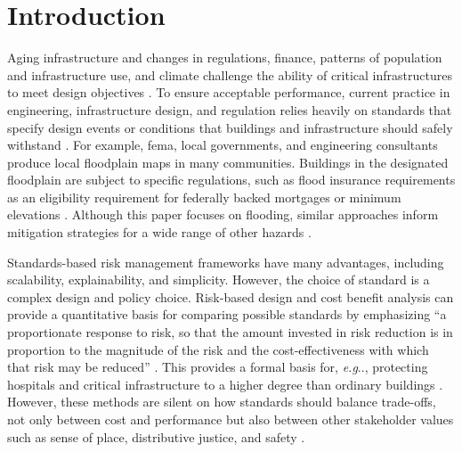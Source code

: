 \documentclass{agujournal2019}
\makeatletter
\DeclareRobustCommand\onedot{\futurelet\@let@token\@onedot}
\def\@onedot{\ifx\@let@token.\else.\null\fi\xspace}
\def\eg{\emph{e.g}\onedot} \def\Eg{\emph{E.g}\onedot}
\makeatother
\begin{document}
\clearpage
\section{Introduction}\label{sec:introduction}

Aging infrastructure and changes in regulations, finance, patterns of population and infrastructure use, and climate challenge the ability of critical infrastructures to meet design objectives \cite{doss-gollin_txtreme:2021,doss-gollin_fatalism:2020,chester_reliable:2020,asce_infrastructure_climate:2021,ho_dams:2017}.
To ensure acceptable performance, current practice in engineering, infrastructure design, and regulation relies heavily on standards that specify design events or conditions that buildings and infrastructure should safely withstand \cite{bruneau_multihazard:2017}.
For example, \gls{fema}, local governments, and engineering consultants produce local floodplain maps in many communities.
Buildings in the designated floodplain are subject to specific regulations, such as flood insurance requirements as an eligibility requirement for federally backed mortgages \cite{kousky_voucher:2014} or minimum elevations \cite{asce_24-05:2006,FEMA_p-55:2011}.
Although this paper focuses on flooding, similar approaches inform mitigation strategies for a wide range of other hazards \cite{asce_7-10:2013}.

Standards-based risk management frameworks have many advantages, including scalability, explainability, and simplicity.
However, the choice of standard is a complex design and policy choice.
Risk-based design and cost benefit analysis \cite{eijgenraam_flooding:2014,vandantzig_dike:1956,xian_elevation:2017} can provide a quantitative basis for comparing possible standards by emphasizing ``a proportionate response to risk, so that the amount invested in risk reduction is in proportion to the magnitude of the risk and the cost-effectiveness with which that risk may be reduced'' \cite{merz_fluvial:2010}.
This provides a formal basis for, \eg, protecting hospitals and critical infrastructure to a higher degree than ordinary buildings \cite{asce_7-10:2013}.
However, these methods are silent on how standards should balance trade-offs, not only between cost and performance but also between other stakeholder values such as sense of place, distributive justice, and safety \cite{keller_management:2021}.
\end{document}

